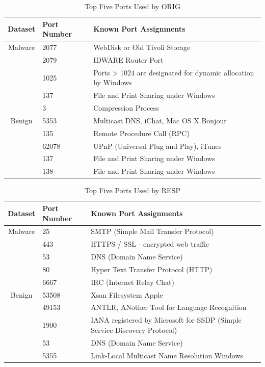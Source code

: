 \begin{table}[!htb]
	\caption{Top Five Ports Used by ORIG\label{tab:3}}
	\begin{center}
		\begin{tabular}{c|p{}|p{}}\hline\hline
			Dataset & Port Number & \multicolumn{1}{l}{Known Port Assignments} \\ \hline
			Malware & 2077 & WebDisk or Old Tivoli Storage \\
			& 2079	&  IDWARE Router Port\\
			& 1025	&  Ports > 1024 are designated for dynamic allocation by Windows\\
			& 137	&  File and Print Sharing under Windows\\
			& 3 &  Compression Process \\ \hline
			Benign & 5353  &  Multicast DNS, iChat, Mac OS X Bonjour\\
			& 135 &  Remote Procedure Call (RPC)\\
			& 62078 &  UPnP (Universal Plug and Play), iTunes\\
			& 137 &  File and Print Sharing under Windows\\
			& 138 &  File and Print Sharing under Windows\\
			\hline\hline
		\end{tabular}
	\end{center}
\end{table}

\begin{table}[!htb]
	\caption{Top Five Ports Used by RESP\label{tab:4}}
	\begin{center}
		\begin{tabular}{c|p{}|p{}}\hline\hline
			Dataset & Port Number & \multicolumn{1}{l}{Known Port Assignments} \\ \hline
			Malware & 25 & SMTP (Simple Mail Transfer Protocol) \\
			& 443	&  HTTPS / SSL - encrypted web traffic\\
			& 53	&  DNS (Domain Name Service)\\
			& 80	&  Hyper Text Transfer Protocol (HTTP) \\
			& 6667 &  IRC (Internet Relay Chat) \\ \hline
			Benign & 53508  &  Xsan Filesystem Apple\\
			& 49153 &  ANTLR, ANother Tool for Language Recognition\\
			& 1900 &  IANA registered by Microsoft for SSDP (Simple Service Discovery Protocol)\\
			& 53 &  DNS (Domain Name Service)\\
			& 5355 &  Link-Local Multicast Name Resolution Windows\\
			\hline\hline
		\end{tabular}
	\end{center}
\end{table}

